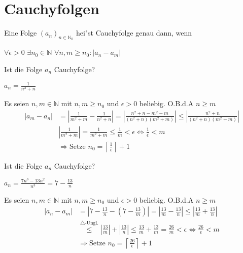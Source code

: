 \documentclass[a4paper,12pt]{article}
\begin{document}
	\section{Cauchyfolgen}
	\begin{defi}
		Eine Folge $\left(a_n\right)_{n \in \mathbb{N}_0}$ hei"st Cauchyfolge genau dann, wenn
		\begin{center}
			$\forall \epsilon > 0$ $\exists n_0 \in \mathbb{N}$ $\forall n,m \geq n_0 : \left|a_n - a_m \right|$
		\end{center}
	\end{defi}
	\begin{bsp}
		Ist die Folge $a_n$ Cauchyfolge?
		\begin{center}
			$a_n = \frac{1}{n^2+n}$
		\end{center}
	\end{bsp}
	Es seien $n,m \in \mathbb{N}$ mit $n, m \geq n_0$ und $\epsilon > 0$ beliebig. O.B.d.A $n \geq m$\\
	\begin{align*}
		\left|a_m - a_n\right| &= \left|\frac{1}{m^2+m} - \frac{1}{n^2+n}\right| = \left|\frac{n^2+n-m^2-m}{\left(n^2+n\right) \left(m^2+m\right)}\right| \leq \left|\frac{n^2+n}{\left(n^2+n\right) \left(m^2+m\right)}\right|\\
		&\left|\frac{1}{m^2+m}\right| = \frac{1}{m^2+m} \leq \frac{1}{m} < \epsilon \Leftrightarrow \frac{1}{\epsilon} < m\\
		&\Rightarrow \text{Setze } n_0 = \left\lceil\frac{1}{\epsilon}\right\rceil + 1
	\end{align*}
	\begin{bsp}
		Ist die Folge $a_n$ Cauchyfolge?
		\begin{center}
			$a_n = \frac{7n^3-13n^2}{n^3} = 7 - \frac{13}{n}$
		\end{center}
	\end{bsp}
	Es seien $n,m \in \mathbb{N}$ mit $n, m \geq n_0$ und $\epsilon > 0$ beliebig. O.B.d.A $n \geq m$\\
	\begin{align*}
		\left|a_n - a_m\right| &= \left|7-\frac{13}{n}-\left(7-\frac{13}{m}\right)\right| = \left|\frac{13}{m} - \frac{13}{n}\right| \leq \left|\frac{13}{m} + \frac{13}{n}\right|\\
		&\overset{\triangle\text{-Ungl.}}{\leq} \left|\frac{13}{m}\right| + \left|\frac{13}{n}\right| \leq \frac{13}{m} + \frac{13}{m} = \frac{26}{m} < \epsilon \Leftrightarrow \frac{26}{\epsilon} < m\\
		&\Rightarrow \text{Setze } n_0 = \left\lceil\frac{26}{\epsilon}\right\rceil + 1
	\end{align*}
	
\end{document}
